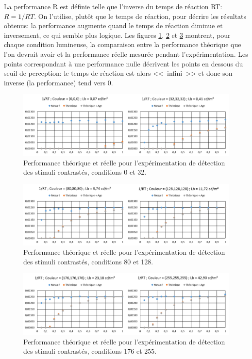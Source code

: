 	\par La performance R est définie telle que l'inverse du temps de réaction RT: $R = 1/RT$. On l'utilise, plutôt que le temps de réaction, pour décrire les résultats obtenus: la performance augmente quand le temps de réaction diminue et inversement, ce qui semble plus logique. Les figures \ref{fig:results_rvp_1}, \ref{fig:results_rvp_2} et \ref{fig:results_rvp_3} montrent, pour chaque condition lumineuse, la comparaison entre la performance théorique que l'on devrait avoir et la performance réelle mesurée pendant l'expérimentation. Les points correspondant à une performance nulle décrivent les points en dessous du seuil de perception: le temps de réaction est alors <<~infini~>> et donc son inverse (la performance) tend vers 0.
	
	\begin{figure}
		\centering
		\includegraphics[width=\linewidth]{Figures/ResultsRVP_1}
		\caption{Performance théorique et réelle pour l'expérimentation de détection des stimuli contrastés, conditions 0 et 32.}
		\label{fig:results_rvp_1}
	\end{figure}
	
	\begin{figure}
		\centering
		\includegraphics[width=\linewidth]{Figures/ResultsRVP_2}
		\caption{Performance théorique et réelle pour l'expérimentation de détection des stimuli contrastés, conditions 80 et 128.}
		\label{fig:results_rvp_2}
	\end{figure}
	
	\begin{figure}
		\centering
		\includegraphics[width=\linewidth]{Figures/ResultsRVP_3}
		\caption{Performance théorique et réelle pour l'expérimentation de détection des stimuli contrastés, conditions 176 et 255.}
		\label{fig:results_rvp_3}
	\end{figure}
		
